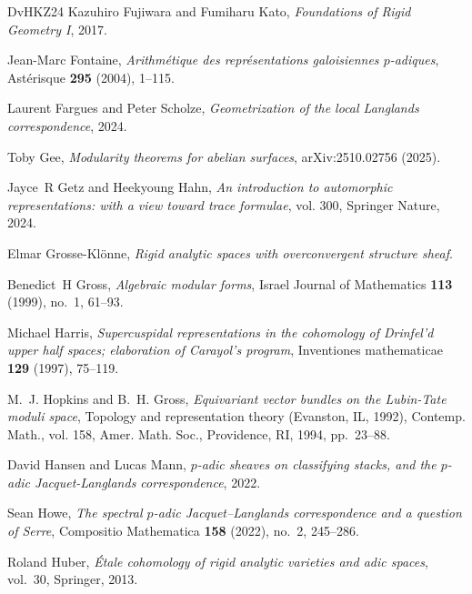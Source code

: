 \documentclass{article}
\theoremstyle{definition}
\begin{document}
\begin{thebibliography}{DvHKZ24}
Kazuhiro Fujiwara and Fumiharu Kato, \emph{{Foundations of Rigid Geometry I}}, 2017.

Jean-Marc Fontaine, \emph{Arithm{\'e}tique des repr{\'e}sentations galoisiennes $p$-adiques}, Ast{\'e}risque \textbf{295} (2004), 1--115.

Laurent Fargues and Peter Scholze, \emph{{Geometrization of the local Langlands correspondence}}, 2024.

Toby Gee, \emph{Modularity theorems for abelian surfaces}, arXiv:2510.02756 (2025).

Jayce~R Getz and Heekyoung Hahn, \emph{An introduction to automorphic representations: with a view toward trace formulae}, vol. 300, Springer Nature, 2024.

Elmar Grosse-Kl{\"o}nne, \emph{Rigid analytic spaces with overconvergent structure sheaf}.

Benedict~H Gross, \emph{Algebraic modular forms}, Israel Journal of Mathematics \textbf{113} (1999), no.~1, 61--93.

Michael Harris, \emph{{Supercuspidal representations in the cohomology of Drinfel'd upper half spaces; elaboration of Carayol's program}}, Inventiones mathematicae \textbf{129} (1997), 75--119.

M.~J. Hopkins and B.~H. Gross, \emph{Equivariant vector bundles on the {L}ubin-{T}ate moduli space}, Topology and representation theory ({E}vanston, {IL}, 1992), Contemp. Math., vol. 158, Amer. Math. Soc., Providence, RI, 1994, pp.~23--88. 

David Hansen and Lucas Mann, \emph{{$p$-adic sheaves on classifying stacks, and the $p$-adic Jacquet-Langlands correspondence}}, 2022.

Sean Howe, \emph{{The spectral $p$-adic Jacquet--Langlands correspondence and a question of Serre}}, Compositio Mathematica \textbf{158} (2022), no.~2, 245--286.

Roland Huber, \emph{{\'E}tale cohomology of rigid analytic varieties and adic spaces}, vol.~30, Springer, 2013.


\end{thebibliography}
\end{document}
